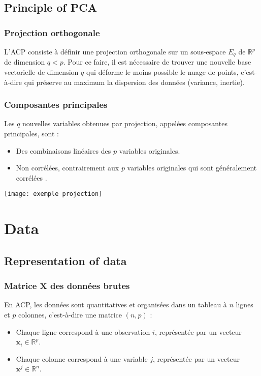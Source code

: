 \documentclass[10pt,a4paper]{article}
\begin{document}
\subsection*{Principle of PCA}
\subsubsection*{Projection orthogonale}
L'ACP consiste à définir une projection orthogonale sur un sous-espace $E_q$ de $\mathbb{R}^p$ de dimension $q < p$. Pour ce faire, il est nécessaire de trouver une nouvelle base vectorielle de dimension $q$ qui déforme le moins possible le nuage de points, c'est-à-dire qui préserve au maximum la dispersion des données (variance, inertie).

\subsubsection*{Composantes principales}
Les $q$ nouvelles variables obtenues par projection, appelées composantes principales, sont :
\begin{itemize}
    \item Des combinaisons linéaires des $p$ variables originales.
    \item Non corrélées, contrairement aux $p$ variables originales qui sont généralement corrélées \cite{geeks_pca}.
\end{itemize}

\texttt{[image: exemple projection]}

\section*{Data}

\subsection*{Representation of data}
\subsubsection*{Matrice $\mathbf{X}$ des données brutes}
En ACP, les données sont quantitatives et organisées dans un tableau à $n$ lignes et $p$ colonnes, c'est-à-dire une matrice $(n, p)$ :
\begin{itemize}
    \item Chaque ligne correspond à une observation $i$, représentée par un vecteur $\mathbf{x}_i \in \mathbb{R}^p$.
    \item Chaque colonne correspond à une variable $j$, représentée par un vecteur $\mathbf{x}^j \in \mathbb{R}^n$.
\end{itemize}
\end{document}
